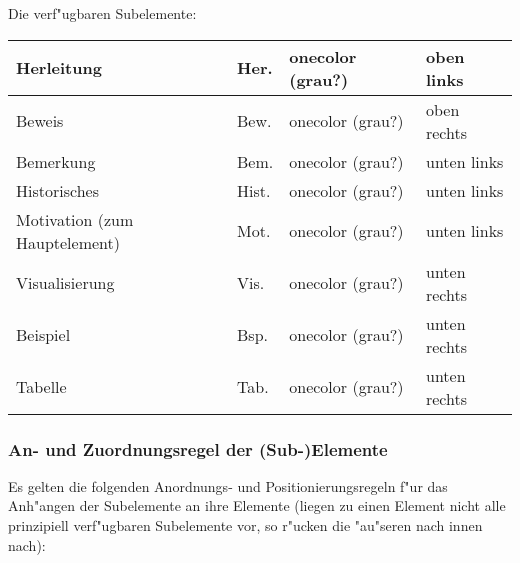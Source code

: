 Die verf"ugbaren Subelemente:
\begin{center}
\begin{tabular}{|l|l|l|l|}
\hline
Herleitung                                      & Her.  & onecolor (grau?)      & oben links\\
\hline
Beweis                                          & Bew.  & onecolor (grau?)      & oben rechts\\
\hline
Bemerkung                                       & Bem.  & onecolor (grau?)      & unten links\\
\hline
Historisches                                    & Hist. & onecolor (grau?)      & unten links\\
\hline
Motivation \footnotesize{(zum Hauptelement)}    & Mot.  & onecolor (grau?)      & unten links\\
\hline
Visualisierung                                  & Vis.  & onecolor (grau?)      & unten rechts\\
\hline
Beispiel                                        & Bsp.  & onecolor (grau?)      & unten rechts\\
\hline
Tabelle                                         & Tab.  & onecolor (grau?)      & unten rechts\\
\hline
\end{tabular}
\end{center}

\clearpage


\subsubsection{An- und Zuordnungsregel der (Sub-)Elemente}\label{anordnungsregeln}

Es gelten die folgenden Anordnungs- und Positionierungsregeln f"ur das
Anh"angen der Subelemente an ihre Elemente (liegen zu einen Element
nicht alle prinzipiell verf"ugbaren Subelemente vor, so r"ucken die
"au"seren nach innen nach):


